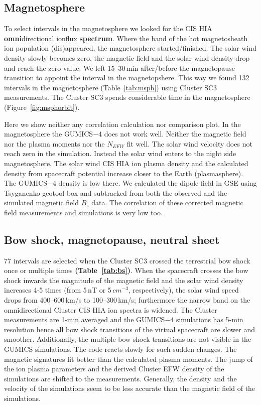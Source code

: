 \documentclass[linenumbers,draft]{agujournal}
\begin{document}
\subsection{Magnetosphere}
\label{sec:msph}

To select intervals in the magnetosphere we looked for the CIS HIA \textbf{omni}directional ionflux \textbf{spectrum}. Where the band of the hot magnetosheath ion population (dis)appeared, the magnetosphere started/finished. The solar wind density slowly becomes zero, the magnetic field and the solar wind density drop and reach the zero value. We left 15--30\,min after/before the magnetopause transition to appoint the interval in the magnetopshere. This way we found 132 intervals in the magnetosphere (Table~\ref{tab:msph}) using Cluster SC3 measurements. The Cluster SC3 spends considerable time in the magnetosphere (Figure~\ref{fig:msphorbit}). 

Here we show neither any correlation calculation nor comparison plot. In the magnetosphere the GUMICS$-$4 does not work well. Neither the magnetic field nor the plasma moments nor the $N_{EFW}$ fit well. The solar wind velocity does not reach zero in the simulation. Instead the solar wind enters to the night side magnetosphere. The solar wind CIS HIA ion plasma density and the calculated density from spacecraft potential increase closer to the Earth (plasmasphere). The GUMICS$-$4 density is low there. We calculated the dipole field in GSE using Tsyganenko geotool box \citep{tsyganenko95:_model_earth} and subtracked from both the observed and the simulated magnetic field $B_z$ data. The correlation of these corrected magnetic field measurements and simulations is very low too. 

\subsection{Bow shock, magnetopause, neutral sheet}
\label{sec:bs}

77 intervals are selected when the Cluster SC3 crossed the terrestrial bow shock once or multiple times \textbf{(Table~\ref{tab:bs})}. When the spacecraft crosses the bow shock inwards the magnitude of the magnetic field and the solar wind density increases 4-5 times (from 5\,nT or 5\,$cm^{-3}$, respectively), the solar wind speed drops from 400--600\,km/s to 100--300\,km/s; furthermore the narrow band on the omnidirectional Cluster CIS HIA ion spectra is widened. The Cluster measurements are 1-min averaged and the GUMICS$-$4 simulations has 5-min resolution hence all bow shock transitions of the virtual spacecraft are slower and smoother. Additionally, the multiple bow shock transitions are not visible in the $\mathrm{GUMICS}$ simulations. The code reacts slowly for such sudden changes. The magnetic signatures fit better than the calculated plasma moments. The jump of the ion plasma parameters and the derived Cluster EFW density of the simulations are shifted to the measurements. Generally, the density and the velocity of the simulations seem to be less accurate than the magnetic field of the simulations.
\end{document}
